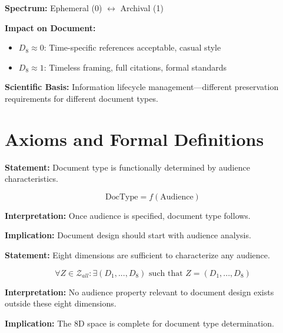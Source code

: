 \textbf{Spectrum:} Ephemeral (0) $\leftrightarrow$ Archival (1)

\textbf{Impact on Document:}
\begin{itemize}[nosep]
\item $D_8 \approx 0$: Time-specific references acceptable, casual style
\item $D_8 \approx 1$: Timeless framing, full citations, formal standards
\end{itemize}

\textbf{Scientific Basis:} Information lifecycle management---different
preservation requirements for different document types.


\section{Axioms and Formal Definitions}
\label{sec:doctype-theory-axioms}

\begin{tcolorbox}[colback=gray!5!white, colframe=gray!75!black,
    title=Axiom DT-1: Audience Primacy]
\textbf{Statement:} Document type is functionally determined by audience characteristics.

\begin{equation}
\text{DocType} = f(\text{Audience})
\end{equation}

\textbf{Interpretation:} Once audience is specified, document type follows.

\textbf{Implication:} Document design should start with audience analysis.
\end{tcolorbox}

\begin{tcolorbox}[colback=gray!5!white, colframe=gray!75!black,
    title=Axiom DT-2: Dimensional Sufficiency]
\textbf{Statement:} Eight dimensions are sufficient to characterize any audience.

\begin{equation}
\forall Z \in \mathcal{Z}_{all}: \exists (D_1, ..., D_8) \text{ such that } Z = (D_1, ..., D_8)
\end{equation}

\textbf{Interpretation:} No audience property relevant to document design
exists outside these eight dimensions.

\textbf{Implication:} The 8D space is complete for document type determination.
\end{tcolorbox}

